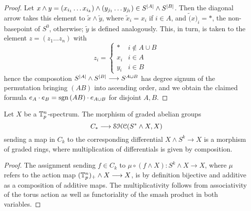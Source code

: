 \begin{lem}
\begin{proof}
          Let $x \wedge y = (x_{i_1} \ldots x_{i_k}) \wedge (y_{j_1} \ldots y_{j_l}) \in S^{\left\vert A\right\vert} \wedge S^{\left\vert B\right\vert}$. Then the diagonal arrow takes this element to $ \tilde{x} \wedge \tilde{y}$, where $\tilde{x}_i = x_i$ if $i \in A$, and $\tilde(x)_i = \ast$, the non-basepoint of $S^0$, otherwise; $\tilde{y}$ is defined analogously. This, in turn, is taken to the element $z = (z_1 \ldots z_n)$ with
          \[ z_i = \left\{
            \begin{array}{ll}
              \ast & i \nin A \cup B \\
              x_i & i \in A \\
              y_i & i \in B
            \end{array}
          \right.\]
          hence the composotion $S^{\left\vert A\right\vert} \wedge S^{\left\vert B\right\vert} \longrightarrow S^{A \cup B}$ has degree signum of the permutation bringing $(AB)$ into ascending order, and we obtain the claimed formula $e_A \cdot e_B = \operatorname{sgn}{(AB)} \cdot e_{A \cup B}$ for disjoint $A,B$.
        \end{proof}
      \end{lem}
      \begin{cor}\label{cor_diffs_ext_alg}
        Let $X$ be a $\mathbb{T}_p^n$-spectrum. The morphism of graded abelian groups%
        \[C_* \longrightarrow \mathcal{SHC}(S^* \wedge X, X)\]%
        sending a map in $C_k$ to the corresponding differential $X \wedge S^k \to X$ is a morphism of graded rings, where multiplication of differentials is given by composition.
        \begin{proof}
          The assignment sending $f \in C_k$ to $\mu \circ (f \wedge X):S^k \wedge X \to X$, where $\mu$ refers to the action map $(\mathbb{T}_p^n)_+ \wedge X \longrightarrow X$, is by definition bijective and additive as a composition of additive maps. The multiplicativity follows from associativity of the torus action as well as functoriality of the smash product in both variables.
        \end{proof}
      \end{cor}
